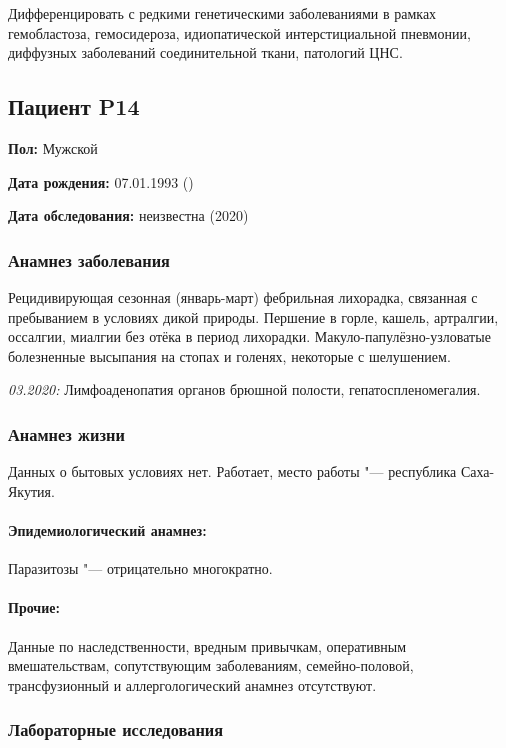 \documentclass[a4paper,14pt]{extarticle}
\newcommand{\pdate}[1]{\emph{#1:} }
\begin{document}
Дифференцировать с редкими генетическими заболеваниями в рамках гемобластоза, гемосидероза, идиопатической интерстициальной пневмонии, диффузных заболеваний соединительной ткани, патологий ЦНС.

\newpage
\subsection*{Пациент P14}

\textbf{Пол:} Мужской

\textbf{Дата рождения:} 07.01.1993 ()

\textbf{Дата обследования:} неизвестна (2020)

\subsubsection*{Анамнез заболевания}

Рецидивирующая сезонная (январь-март) фебрильная лихорадка, связанная с пребыванием в условиях дикой природы.
Першение в горле, кашель, артралгии, оссалгии, миалгии без отёка в период лихорадки.
Макуло-папулёзно-узловатые болезненные высыпания на стопах и голенях, некоторые с шелушением.

\pdate{03.2020} Лимфоаденопатия органов брюшной полости, гепатоспленомегалия.

\subsubsection*{Анамнез жизни}

Данных о бытовых условиях нет.
Работает, место работы "--- республика Саха-Якутия.

\paragraph{Эпидемиологический анамнез:} Паразитозы "--- отрицательно многократно.

\paragraph{Прочие:} Данные по наследственности, вредным привычкам, оперативным вмешательствам, сопутствующим заболеваниям, семейно-половой, трансфузионный и аллергологический анамнез отсутствуют.

\subsubsection*{Лабораторные исследования}
\end{document}
